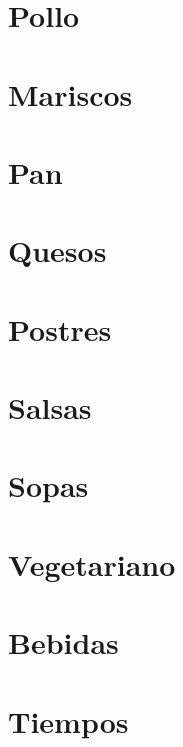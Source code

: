 \documentclass[twoside,12pt]{article}
\begin{document}
\section{Pollo}


\section{Mariscos}


\section{Pan}



\section{Quesos}




\section{Postres}

























\section{Salsas}








\section{Sopas}




\section{Vegetariano}


\section{Bebidas}


\section{Tiempos}

\end{document}
